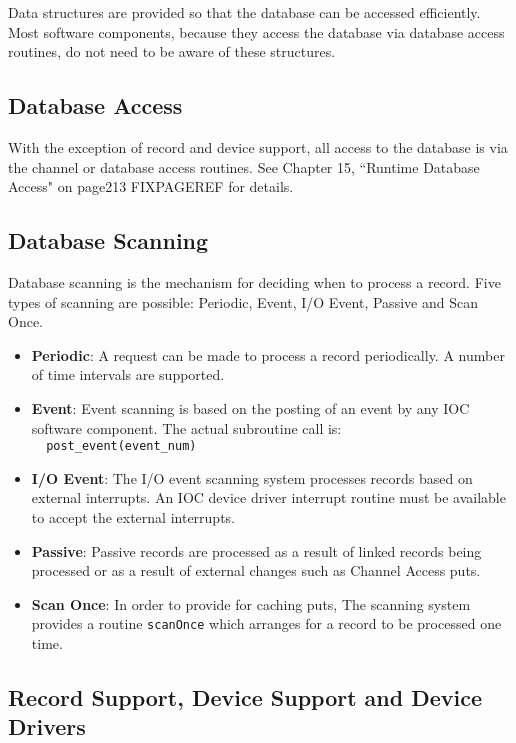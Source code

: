 Data structures are provided so that the database can be accessed efficiently. Most software components, because they 
access the database via database access routines, do not need to be aware of these structures.

\subsection{Database Access}

With the exception of record and device support, all access to the database is via the channel or database access routines. 
See Chapter 15, ``Runtime Database Access" on page213 FIXPAGEREF for details.

\subsection{Database Scanning}

Database scanning is the mechanism for deciding when to process a record. Five types of scanning are possible: Periodic, 
Event, I/O Event, Passive and Scan Once.

\begin{itemize}
\item \textbf{\textbf{Periodic}}:  A request can be made to process a record periodically. A number of time intervals are supported.

\item \textbf{\textbf{Event}}:  Event scanning is based on the posting of an event by any IOC software component. The actual subroutine 
call is: \\
\verb|  post_event(event_num)| 
\item \textbf{\textbf{I/O Event}}:  The I/O event scanning system processes records based on external interrupts. An IOC device driver 
interrupt routine must be available to accept the external interrupts.

\item \textbf{\textbf{Passive}}:  Passive records are processed as a result of linked records being processed or as a result of external 
changes such as Channel Access puts.

\item \textbf{\textbf{Scan Once}}: In order to provide for caching puts, The scanning system provides a routine \verb|scanOnce| which 
arranges for a record to be processed one time.

\end{itemize}\subsection{Record Support, Device Support and Device Drivers}

